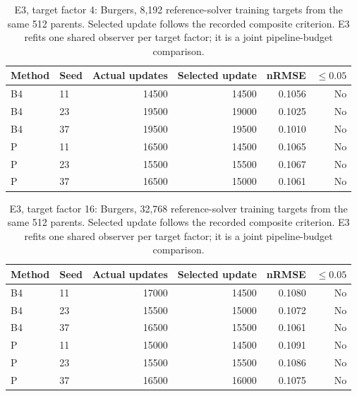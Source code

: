 \begin{table}[!ht]
\centering\small
\caption{E3, target factor 4: Burgers, 8,192 reference-solver training targets from the same 512 parents. Selected update follows the recorded composite criterion. E3 refits one shared observer per target factor; it is a joint pipeline-budget comparison.}\label{tab:scaling_E3_4}
\begin{tabular}{@{}llrrrr@{}}\toprule
Method & Seed & Actual updates & Selected update & nRMSE & $\leq0.05$\\\midrule
B4 & 11 & 14500 & 14500 & 0.1056 & No\\
B4 & 23 & 19500 & 19000 & 0.1025 & No\\
B4 & 37 & 19500 & 19500 & 0.1010 & No\\
P & 11 & 16500 & 14500 & 0.1065 & No\\
P & 23 & 15500 & 15500 & 0.1067 & No\\
P & 37 & 16500 & 15000 & 0.1061 & No\\
\bottomrule\end{tabular}
\end{table}

\begin{table}[!ht]
\centering\small
\caption{E3, target factor 16: Burgers, 32,768 reference-solver training targets from the same 512 parents. Selected update follows the recorded composite criterion. E3 refits one shared observer per target factor; it is a joint pipeline-budget comparison.}\label{tab:scaling_E3_16}
\begin{tabular}{@{}llrrrr@{}}\toprule
Method & Seed & Actual updates & Selected update & nRMSE & $\leq0.05$\\\midrule
B4 & 11 & 17000 & 14500 & 0.1080 & No\\
B4 & 23 & 15500 & 15000 & 0.1072 & No\\
B4 & 37 & 16500 & 15500 & 0.1061 & No\\
P & 11 & 15000 & 14500 & 0.1091 & No\\
P & 23 & 15500 & 15500 & 0.1086 & No\\
P & 37 & 16500 & 16000 & 0.1075 & No\\
\bottomrule\end{tabular}
\end{table}
